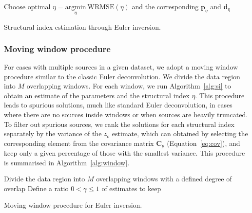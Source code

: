 \begin{algorithm}[!htb]
  Choose optimal $\eta = \underset{\eta}{\text{argmin}}\ \text{WRMSE}(\eta)$ and the corresponding
  $\mathbf{p}_{\eta}$ and $\mathbf{d}_{\eta}$
  \;
  \BlankLine
  \caption{Structural index estimation through Euler inversion.}
  \label{alg:si}
\end{algorithm}

\subsubsection{Moving window procedure}

For cases with multiple sources in a given dataset, we adopt a moving window
procedure similar to the classic Euler deconvolution.
We divide the data region into $M$ overlapping windows.
For each window, we run Algorithm~\ref{alg:si} to obtain an estimate of the
parameters and the structural index $\eta$.
This procedure leads to spurious solutions, much like standard Euler
deconvolution, in cases where there are no sources inside windows or when
sources are heavily truncated.
To filter out spurious sources, we rank the solutions for each structural index
separately by the variance of the $z_o$ estimate, which can obtained by
selecting the corresponding element from the covariance matrix $\mathbf{C}_p$
(Equation~\ref{eq:cov}),
and keep only a given percentage of those with the smallest variance.
This procedure is summarised in Algorithm~\ref{alg:window}.

\begin{algorithm}[!htb]
  Divide the data region into $M$ overlapping windows with a defined degree of
  overlap
  \;
  Define a ratio $0 < \gamma \le 1$ of estimates to keep
  \;
  \BlankLine
  \caption{Moving window procedure for Euler inversion.}
  \label{alg:window}
\end{algorithm}



